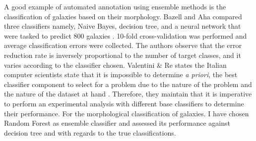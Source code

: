 A good example of automated annotation using ensemble methods is the classification of galaxies based on their morphology. Bazell and Aha compared three classifiers namely, Naive Bayes, decision tree, and a neural network that were tasked to predict 800 galaxies \parencite*{bazell_ensembles_2001}. 10-fold cross-validation was performed and average classification errors were collected. The authors observe that the error reduction rate is inversely proportional to the number of target classes, and it varies according to the classifier chosen. Valentini \& Re states the Italian computer scientists state that it is impossible to determine \emph{a priori}, the best classifier component to select for a problem due to the nature of the problem and the nature of the dataset at hand \parencite*[579]{way_advances_2012}. Therefore, they maintain that it is imperative to perform an experimental analysis with different base classifiers to determine their performance. For the morphological classification of galaxies. I have chosen Random Forest as ensemble classifier and assessed its performance against decision tree and with regards to the true classifications.